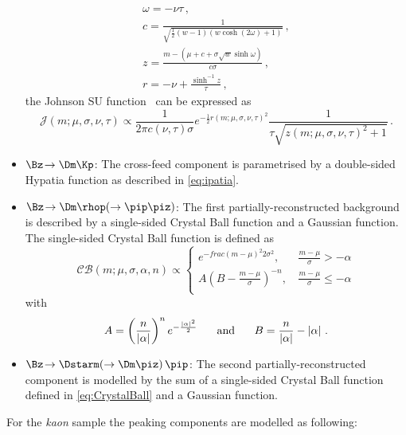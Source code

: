 \begin{itemize}
\begin{align*}
	&\omega=-\nu\tau\,,&\\
	&c=\frac{1}{\sqrt{\frac{1}{2}\left(w-1\right)\left(w\cosh\!\left(2\omega\right)+1\right)}}\,,&\\
	&z=\frac{m-\left(\mu+c+\sigma\sqrt{w}\sinh\omega\right)}{c\sigma}\,,&\\
	&r=-\nu+\frac{\sinh^{-1}z}{\tau}\,,&
	\end{align*}
	the Johnson SU function~\cite{JohnsonSU} can be expressed as
	\begin{equation}
	\mathcal{J}\!\left(m;\mu,\sigma,\nu,\tau\right)\propto\frac{1}{2\pi c(\nu,\tau)\sigma}e^{-\frac{1}{2}r(m;\mu,\sigma,\nu,\tau)^2}\frac{1}{\tau\sqrt{z(m;\mu,\sigma,\nu,\tau)^2+1}}\,.\label{eq:johnsonsu}
	\end{equation}
	\item $\Bz\!\to\Dm\Kp$: The cross-feed component is parametrised by a double-sided Hypatia function as described in \cref{eq:ipatia}.
	\item $\Bz\!\to\Dm\rhop\!\left(\to\pip\piz\right)$: The first partially-reconstructed background is described by a single-sided Crystal Ball function and a Gaussian function.
	The single-sided Crystal Ball function is defined as
	\begin{equation}
	\mathcal{C\!B}\!\left(m;\mu,\sigma,\alpha,n\right)\propto\begin{cases}
	e^{-frac{(m-\mu)^2}{2\sigma^2}}, &\, \frac{m-\mu}{\sigma}>-\alpha\\
	A\left(B-\frac{m-\mu}{\sigma}\right)^{-n}, &\, \frac{m-\mu}{\sigma}\leq-\alpha\\\end{cases}\label{eq:CrystalBall}
	\end{equation}
	with
	\begin{equation}
	A=\left(\frac{n}{\left|\alpha\right|}\right)^{n}e^{-\frac{\left|\alpha\right|^2}{2}}\hspace{0.5cm}\text{ and }\hspace{0.5cm}B=\frac{n}{\left|\alpha\right|}-\left|\alpha\right|\,.
	\end{equation}
	\item $\Bz\!\to\Dstarm\!\left(\to\Dm\piz\right)\pip$: The second partially-reconstructed component is modelled by the sum of a single-sided Crystal Ball function defined in \cref{eq:CrystalBall} and a Gaussian function.
\end{itemize}
For the \emph{kaon} sample the peaking components are modelled as following:
